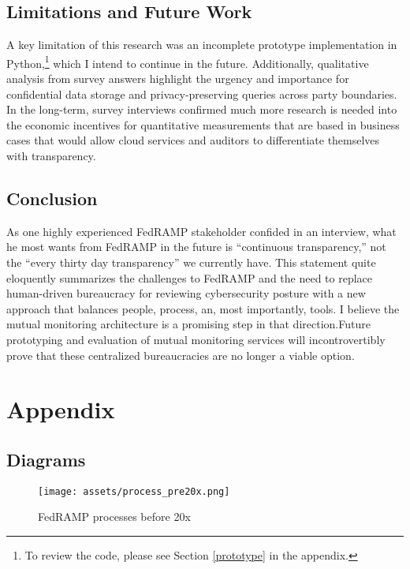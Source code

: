 \documentclass{jdf}
\begin{document}
\subsection{Limitations and Future Work}

A key limitation of this research was an incomplete prototype implementation in Python,\footnote{To review the code, please see Section \ref{prototype} in the appendix.} which I intend to continue in the future. Additionally, qualitative analysis from survey answers highlight the urgency and importance for confidential data storage and privacy-preserving queries across party boundaries. In the long-term, survey interviews confirmed much more research is needed into the economic incentives for quantitative measurements that are based in business cases that would allow cloud services and auditors to differentiate themselves with transparency.

\subsection{Conclusion}

As one highly experienced FedRAMP stakeholder confided in an interview, what he most wants from FedRAMP in the future is ``continuous transparency,'' not the ``every thirty day transparency'' we currently have. This statement quite eloquently summarizes the challenges to FedRAMP and the need to replace human-driven bureaucracy for reviewing cybersecurity posture with a new approach that balances people, process, an, most importantly, tools. I believe the mutual monitoring architecture is a promising step in that direction.Future prototyping and evaluation of mutual monitoring services will incontrovertibly prove that these centralized bureaucracies are no longer a viable option.




\section{Appendix}

\subsection{Diagrams}

\begin{figure}[h!]
\centering
\texttt{[image: assets/process\_pre20x.png]}
\caption{FedRAMP processes before 20x}
\label{fig:conmon1}
\end{figure}
\end{document}
